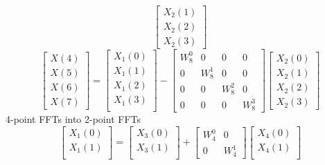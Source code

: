 \documentclass[journal,12pt,twocolumn]{IEEEtran}
\renewcommand\thesection{\arabic{section}}
\begin{document}
\begin{enumerate}[label=\arabic*.,ref=\thesection.\theenumi]
\begin{equation}
\begin{bmatrix}
			X_{2}(1) \\ 
			X_{2}(2) \\
			X_{2}(3)
		\end{bmatrix}
	\end{equation}
	\begin{equation}
		\begin{bmatrix}
			X(4) \\ 
			X(5) \\ 
			X(6) \\ 
			X(7)
		\end{bmatrix}
		=
		\begin{bmatrix}
			X_{1}(0) \\ 
			X_{1}(1)\\ 
			X_{1}(2)\\
			X_{1}(3)\\
		\end{bmatrix}
		-
		\begin{bmatrix}
			W^{0}_{8} & 0 & 0 & 0\\
			0 & W^{1}_{8} & 0 & 0\\
			0 & 0 & W^{2}_{8} & 0\\
			0 & 0 & 0 & W^{3}_{8}
		\end{bmatrix}
		\begin{bmatrix}
			X_{2}(0) \\ 
			X_{2}(1) \\ 
			X_{2}(2) \\
			X_{2}(3)
		\end{bmatrix}
	\end{equation}
	4-point FFTs into 2-point FFTs
	\begin{equation}
		\begin{bmatrix}
			X_{1}(0) \\ 
			X_{1}(1)\\ 
		\end{bmatrix}
		=
		\begin{bmatrix}
			X_{3}(0) \\ 
			X_{3}(1)\\ 
		\end{bmatrix}
		+
		\begin{bmatrix}
			W^{0}_{4} & 0\\
			0 & W^{1}_{4}
		\end{bmatrix}
		\begin{bmatrix}
			X_{4}(0) \\ 
			X_{4}(1) \\ 
		\end{bmatrix}
	\end{equation}

\end{enumerate}
\end{document}
